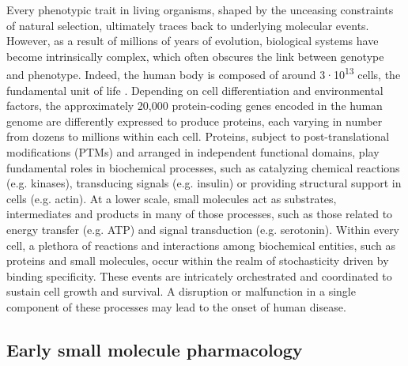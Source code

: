 Every phenotypic trait in living organisms, shaped by the unceasing constraints of natural selection, ultimately traces back to underlying molecular events. However, as a result of millions of years of evolution, biological systems have become intrinsically complex, which often obscures the link between genotype and phenotype. Indeed, the human body is composed of around 3·10\textsuperscript{13} cells, the fundamental unit of life \cite{hatton_human_2023, sender_revised_2016, bianconi_estimation_2013}. Depending on cell differentiation and environmental factors, the approximately 20,000 protein-coding genes encoded in the human genome are differently expressed to produce proteins, each varying in number from dozens to millions within each cell\cite{pertea_between_2010, beck_quantitative_2011, ezkurdia_multiple_2014, international_human_genome_sequencing_consortium_finishing_2004, ezkurdia_most_2015}. Proteins, subject to post-translational modifications (PTMs) and arranged in independent functional domains, play fundamental roles in biochemical processes, such as catalyzing chemical reactions (e.g. kinases), transducing signals (e.g. insulin) or providing structural support in cells (e.g. actin)\cite{khoury_proteome-wide_2011, walsh_protein_2005}. At a lower scale, small molecules act as substrates, intermediates and products in many of those processes, such as those related to energy transfer (e.g. ATP) and signal transduction (e.g. serotonin). Within every cell, a plethora of reactions and interactions among biochemical entities, such as proteins and small molecules, occur within the realm of stochasticity driven by binding specificity. These events are intricately orchestrated and coordinated to sustain cell growth and survival. A disruption or malfunction in a single component of these processes may lead to the onset of human disease.

\subsection{Early small molecule pharmacology}
\label{Introduction_early}

